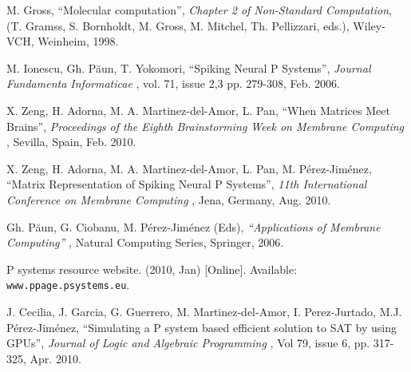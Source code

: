 \documentclass{acm_proc_article-sp}
\begin{document}


%
%

\begin{thebibliography}{9999}



 M. Gross,  ``Molecular computation'', {\it Chapter 2 of Non-Standard Computation}, (T. Gramss,
S. Bornholdt, M. Gross, M. Mitchel, Th. Pellizzari, eds.), Wiley-VCH, Weinheim, 1998.


 M. Ionescu, Gh. P\u aun, T. Yokomori, ``Spiking Neural P Systems'', {\it Journal Fundamenta Informaticae  }, vol. 71, issue 2,3 pp. 279-308, Feb. 2006.

 X. Zeng, H. Adorna, M. A. Martinez-del-Amor, L. Pan, ``When Matrices Meet Brains'', {\it Proceedings of the Eighth Brainstorming Week on Membrane Computing }, Sevilla, Spain, Feb. 2010.

 X. Zeng, H. Adorna, M. A. Martinez-del-Amor, L. Pan, M. P\'{e}rez-Jim\'{e}nez, ``Matrix Representation of Spiking Neural P Systems'', {\it 11th International Conference on Membrane Computing }, Jena, Germany, Aug. 2010.


 Gh. P\u aun, G. Ciobanu, M. P\'{e}rez-Jim\'{e}nez (Eds), {\it ``Applications of Membrane Computing'' }, Natural Computing Series, Springer, 2006.

 P systems resource website. (2010, Jan) [Online]. Available: {\tt www.ppage.psystems.eu}.

 J. Cecilia, J. Garcia, G. Guerrero, M. Martinez-del-Amor, I. Perez-Jurtado, M.J. P\'{e}rez-Jim\'{e}nez, ``Simulating a P system based efficient solution to SAT by using GPUs'', {\it Journal of Logic and Algebraic Programming }, Vol 79, issue 6, pp. 317-325, Apr. 2010.


\end{thebibliography}
\end{document}
